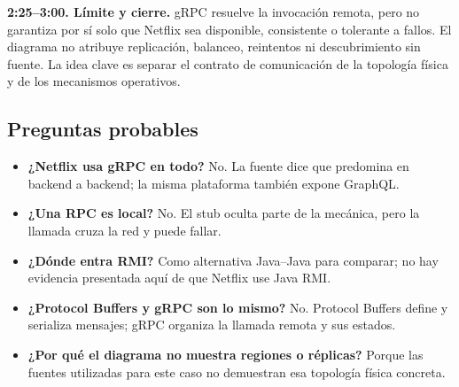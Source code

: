 \textbf{2:25--3:00. Límite y cierre.}
gRPC resuelve la invocación remota, pero no garantiza por sí solo que Netflix
sea disponible, consistente o tolerante a fallos. El diagrama no atribuye
replicación, balanceo, reintentos ni descubrimiento sin fuente. La idea clave es
separar el contrato de comunicación de la topología física y de los mecanismos
operativos.

\subsection*{Preguntas probables}

\begin{itemize}
  \item \textbf{¿Netflix usa gRPC en todo?} No. La fuente dice que predomina en
  backend a backend; la misma plataforma también expone GraphQL.
  \item \textbf{¿Una RPC es local?} No. El stub oculta parte de la mecánica,
  pero la llamada cruza la red y puede fallar.
  \item \textbf{¿Dónde entra RMI?} Como alternativa Java--Java para comparar;
  no hay evidencia presentada aquí de que Netflix use Java RMI.
  \item \textbf{¿Protocol Buffers y gRPC son lo mismo?} No. Protocol Buffers
  define y serializa mensajes; gRPC organiza la llamada remota y sus estados.
  \item \textbf{¿Por qué el diagrama no muestra regiones o réplicas?} Porque las
  fuentes utilizadas para este caso no demuestran esa topología física concreta.
\end{itemize}
